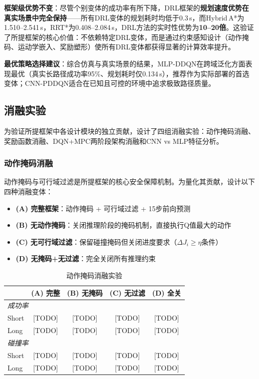 \documentclass[twocolumn]{elsarticle}
\begin{document}
\textbf{框架级优势不变}：尽管个别变体的成功率有所下降，DRL框架的\textbf{规划速度优势在真实场景中完全保持}——所有DRL变体的规划耗时均低于0.3\,s，而Hybrid\,A*为1.510--2.541\,s，RRT*为0.408--2.084\,s，DRL方法的实时性优势为\textbf{10--20倍}。这验证了所提框架的核心价值：不依赖特定DRL变体，而是通过约束感知设计（动作掩码、运动学嵌入、奖励塑形）使所有DRL变体都获得显著的计算效率提升。

\textbf{最优策略选择建议}：综合仿真与真实场景的结果，MLP-DDQN在跨域泛化方面表现最优（真实长路径成功率95\%、规划耗时仅0.134\,s），推荐作为实际部署的首选变体；CNN-PDDQN适合在已知且可控的环境中追求极致路径质量。

\subsection{消融实验}\label{sec:ablation}

为验证所提框架中各设计模块的独立贡献，设计了四组消融实验：动作掩码消融、奖励函数消融、DQN+MPC两阶段架构消融和CNN vs MLP特征分析。

\subsubsection{动作掩码消融}

动作掩码与可行域过滤是所提框架的核心安全保障机制。为量化其贡献，设计以下四种消融变体：

\begin{itemize}
  \item \textbf{(A) 完整框架}：动作掩码 + 可行域过滤 + 15步前向预测
  \item \textbf{(B) 无动作掩码}：关闭推理阶段的掩码机制，直接执行Q值最大的动作
  \item \textbf{(C) 无可行域过滤}：保留碰撞掩码但关闭进度要求（$\Delta J_i \geq \eta$条件）
  \item \textbf{(D) 无掩码+无过滤}：完全关闭所有推理约束
\end{itemize}

\begin{table}[t]
\centering
\caption{动作掩码消融实验}
\label{tab:ablation_mask}
\footnotesize
\begin{tabular}{@{}lcccc@{}}
\toprule
 & \textbf{(A) 完整} & \textbf{(B) 无掩码} & \textbf{(C) 无过滤} & \textbf{(D) 全关} \\
\midrule
\multicolumn{5}{l}{\textit{成功率}} \\
Short & [TODO] & [TODO] & [TODO] & [TODO] \\
Long  & [TODO] & [TODO] & [TODO] & [TODO] \\
\midrule
\multicolumn{5}{l}{\textit{碰撞率}} \\
Short & [TODO] & [TODO] & [TODO] & [TODO] \\
Long  & [TODO] & [TODO] & [TODO] & [TODO] \\
\bottomrule
\end{tabular}
\end{table}
\end{document}
